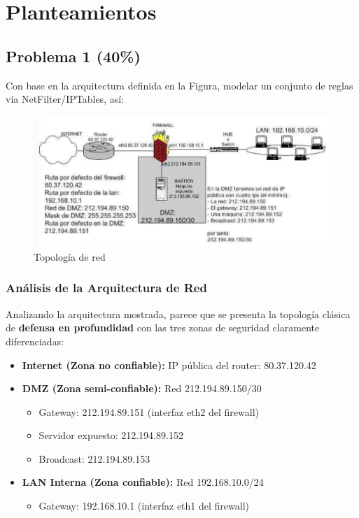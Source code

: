 \chapter[Planteamientos]{Planteamientos}

{
\parindent0pt

\vspace{.935em}

\section{Problema 1 (40\%)}
Con base en la arquitectura definida en la Figura, modelar un conjunto de reglas vía NetFilter/IPTables, así:


\begin{figure}
    \centering
    \includegraphics[width=0.5\linewidth]{topologia.png}
    \caption{Topología de red}
    \label{fig:arquitectura-de-red}
\end{figure}


\subsection{Análisis de la Arquitectura de Red}

Analizando la arquitectura mostrada, parece que se presenta la topología clásica de \textbf{defensa en profundidad} con las tres zonas de seguridad claramente diferenciadas:

\begin{itemize}
    \item \textbf{Internet (Zona no confiable):} IP pública del router: 80.37.120.42
    \item \textbf{DMZ (Zona semi-confiable):} Red 212.194.89.150/30
    \begin{itemize}
        \item Gateway: 212.194.89.151 (interfaz eth2 del firewall)
        \item Servidor expuesto: 212.194.89.152
        \item Broadcast: 212.194.89.153
    \end{itemize}
    \item \textbf{LAN Interna (Zona confiable):} Red 192.168.10.0/24
    \begin{itemize}
        \item Gateway: 192.168.10.1 (interfaz eth1 del firewall)
    \end{itemize}
\end{itemize}

}
